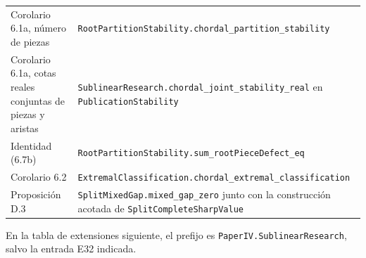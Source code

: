 \documentclass[spanish,11pt,a4paper]{article}
\begin{document}
{\begin{longtable}[]{@{}
  >{\raggedright\arraybackslash}p{}
  >{\raggedright\arraybackslash}p{}@{}}
Corolario 6.1a, número de piezas &
\nolinkurl{RootPartitionStability.chordal_partition_stability} \\
Corolario 6.1a, cotas reales conjuntas de piezas y aristas &
\nolinkurl{SublinearResearch.chordal_joint_stability_real} en
\nolinkurl{PublicationStability} \\
Identidad (6.7b) &
\nolinkurl{RootPartitionStability.sum_rootPieceDefect_eq} \\
Corolario 6.2 &
\nolinkurl{ExtremalClassification.chordal_extremal_classification} \\
Proposición D.3 & \nolinkurl{SplitMixedGap.mixed_gap_zero} junto con la
construcción acotada de \nolinkurl{SplitCompleteSharpValue} \\
\end{longtable}
}

En la tabla de extensiones siguiente, el prefijo es
\nolinkurl{PaperIV.SublinearResearch}, salvo la entrada E32 indicada.
\end{document}

